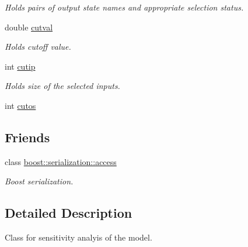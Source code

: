\begin{DoxyCompactItemize}
\begin{DoxyCompactList}\small\item\em Holds pairs of output state names and appropriate selection status. \end{DoxyCompactList}\item 
double \hyperlink{class_go_s_u_m_1_1_c_reduction_a62e583dd897673d455630507380066df}{cutval}
\begin{DoxyCompactList}\small\item\em Holds cutoff value. \end{DoxyCompactList}\item 
int \hyperlink{class_go_s_u_m_1_1_c_reduction_a39c3a8d17c0bd32d092554277554adce}{cutip}
\begin{DoxyCompactList}\small\item\em Holds size of the selected inputs. \end{DoxyCompactList}\item 
int \hyperlink{class_go_s_u_m_1_1_c_reduction_a5b4753c603e0e498087f9d0f217bad9d}{cutos}
\end{DoxyCompactItemize}
\subsection*{Friends}
\begin{DoxyCompactItemize}
\item 
class \hyperlink{class_go_s_u_m_1_1_c_reduction_ac98d07dd8f7b70e16ccb9a01abf56b9c}{boost\-::serialization\-::access}
\begin{DoxyCompactList}\small\item\em Boost serialization. \end{DoxyCompactList}\end{DoxyCompactItemize}


\subsection{Detailed Description}
Class for sensitivity analyis of the model. 

